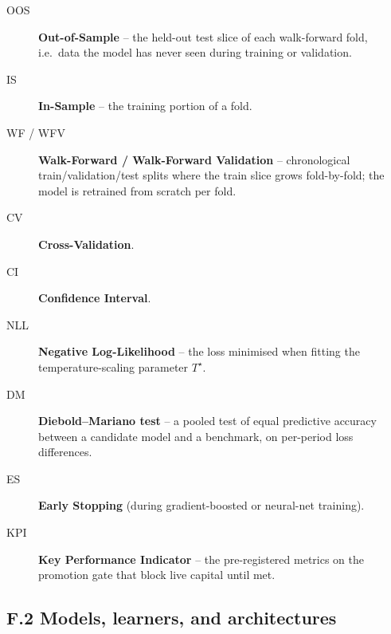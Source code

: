\begin{description}
    \item[OOS] \textbf{Out-of-Sample} -- the held-out test slice of each walk-forward fold, i.e.\ data the model has never seen during training or validation.
    \item[IS] \textbf{In-Sample} -- the training portion of a fold.
    \item[WF / WFV] \textbf{Walk-Forward / Walk-Forward Validation} -- chronological train/validation/test splits where the train slice grows fold-by-fold; the model is retrained from scratch per fold.
    \item[CV] \textbf{Cross-Validation}.
    \item[CI] \textbf{Confidence Interval}.
    \item[NLL] \textbf{Negative Log-Likelihood} -- the loss minimised when fitting the temperature-scaling parameter $T^\star$.
    \item[DM] \textbf{Diebold--Mariano test} -- a pooled test of equal predictive accuracy between a candidate model and a benchmark, on per-period loss differences.
    \item[ES] \textbf{Early Stopping} (during gradient-boosted or neural-net training).
    \item[KPI] \textbf{Key Performance Indicator} -- the pre-registered metrics on the promotion gate that block live capital until met.
\end{description}

\subsection*{F.2 Models, learners, and architectures}

